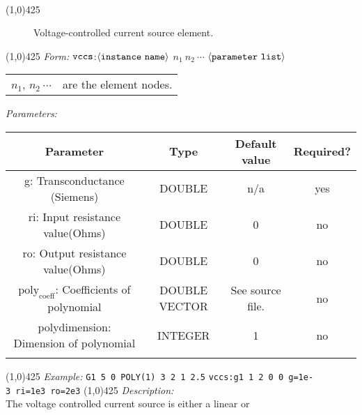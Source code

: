 \documentclass{article}
\begin{document}
\\
\hrulefill\linethickness{0.5mm}\line(1,0){425}
\normalsize
\newline
\begin{figure}[h]
\centerline{\epsfxsize=2.5in}
\caption{Voltage-controlled current source element.}
\end{figure}
\newline
\linethickness{0.5mm} \line(1,0){425}
\newline
\textit{Form:}
\newline
$\tt vccs$:$\langle \tt{instance\ name}\rangle$ $n_1\ n_2\ \cdots$
$\langle \tt{parameter\ list}\rangle$
\begin{tabular}{r l}
$n_1$, $n_2\ \cdots$ & are the element nodes. \\
\end{tabular}
\newline
\textit{Parameters:}
\begin{table}[H]
\begin{tabular}{|c|c|c|c|}
\hline
Parameter&Type&Default value&Required?\\
\hline
g: Transconductance (Siemens) & DOUBLE & n/a & yes \\
\hline
ri: Input resistance value(Ohms) & DOUBLE & 0 & no\\
\hline
ro: Output resistance value(Ohms) & DOUBLE & 0 & no\\
\hline $\mathrm{poly_{coeff}}$: Coefficients of polynomial &
DOUBLE VECTOR
& See source file. & no\\
\hline
polydimension: Dimension of polynomial & INTEGER & 1 & no\\
\par
\hline
\end{tabular}
\end{table}
\noindent\linethickness{0.5mm}\line(1,0){425}
\newline
\textit{Example:}
\newline
\texttt{G1\ 5\ 0\ POLY(1)\ 3\ 2\ 1\ 2.5}
\newline
\texttt{vccs:g1\ 1\ 2\ 0\ 0\ g=1e-3\ ri=1e3\ ro=2e3}
\newline
\linethickness{0.5mm} \line(1,0){425}
\newline
\textit{Description:}\\
The voltage controlled current source is either a linear or
\end{document}
